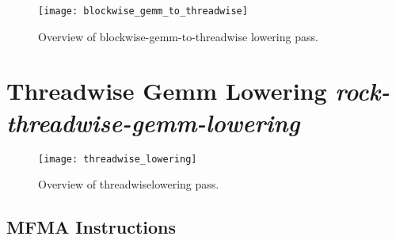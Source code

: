 \begin{figure}[!h]
  \centering
  \texttt{[image: blockwise\_gemm\_to\_threadwise]}
  \caption{Overview of blockwise-gemm-to-threadwise lowering pass.}
  \label{fig:gridwise_gemm_to_blockwise}
\end{figure}



\section{Threadwise Gemm Lowering \emph{rock-threadwise-gemm-lowering}}

\begin{figure}[!h]
  \centering
  \texttt{[image: threadwise\_lowering]}
  \caption{Overview of threadwiselowering pass.}
  \label{fig:gridwise_gemm_to_blockwise}
\end{figure}


\subsection{MFMA Instructions}




